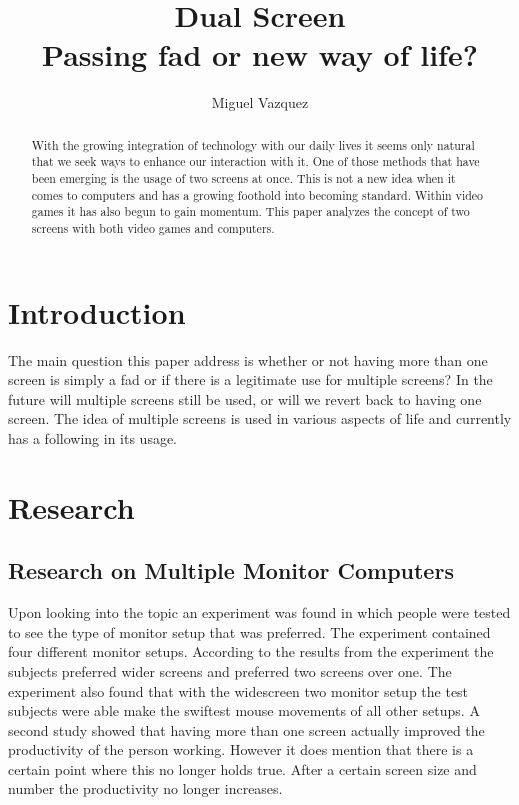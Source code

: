 \documentclass[11pt]{article}
\title{\textbf{Dual Screen} \\Passing fad or new way of life?}
\author{Miguel Vazquez}
\begin{document}
\maketitle
\begin{abstract}
With the growing integration of technology with our daily lives it seems only natural that we seek ways to enhance our interaction with it. One of those methods that have been emerging is the usage of two screens at once. This is not a new idea when it comes to computers and has a growing foothold into becoming standard. Within video games it has also begun to gain momentum. This paper analyzes the concept of two screens with both video games and computers.
\end{abstract}

\tableofcontents

\section{Introduction}
The main question this paper address is whether or not having more than one screen is simply a fad or if there is a legitimate use for multiple screens? In the future will multiple screens still be used, or will we revert back to having one screen. The idea of multiple screens is used in various aspects of life and currently has a following in its usage.


\section{Research}
\subsection{Research on Multiple Monitor Computers}
Upon looking into the topic an experiment was found \cite{monitors} in which people were tested to see the type of monitor setup that was preferred. The experiment contained four different monitor setups. According to the results from the experiment the subjects preferred wider screens and preferred two screens over one. The experiment also found that with the widescreen two monitor setup the test subjects were able make the swiftest mouse movements of all other setups. A second study \cite{monitors2} showed that having more than one screen actually improved the productivity of the person working. However it does mention that there is a certain point where this no longer holds true. After a certain screen size and number the productivity no longer increases.
\end{document}

